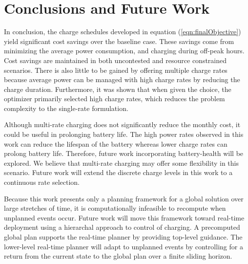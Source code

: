 \section{Conclusions and Future Work }
In conclusion, the charge schedules developed in equation (\ref{eqn:finalObjective}) yield significant cost savings over the baseline case. These savings come from minimizing the average power consumption, and charging during off-peak hours. Cost savings are maintained in both uncontested and resource constrained scenarios.  There is also little to be gained by offering multiple charge rates because average power can be managed with high charge rates by reducing the charge duration. Furthermore, it was shown that when given the choice, the optimizer primarily selected high charge rates, which reduces the problem complexity to the single-rate formulation.
\par Although multi-rate charging does not significantly reduce the monthly cost, it could be useful in prolonging battery life. The high power rates observed in this work can reduce the lifespan of the battery whereas lower charge rates can prolong battery life.  Therefore, future work incorporating battery-health will be explored.  We believe that multi-rate charging may offer some flexibility in this scenario.  Future work will extend the discrete charge levels in this work to a continuous rate selection.
\par Because this work presents only a planning framework for a global solution over large stretches of time, it is computationally infeasible to recompute when unplanned events occur. Future work will move this framework toward real-time deployment using a hierarchal approach to control of charging.  A precomputed global plan supports the real-time planner by providing top-level guidance.  The lower-level real-time planner will adapt to unplanned events by controlling for a return from the current state to the global plan over a finite sliding horizon.
